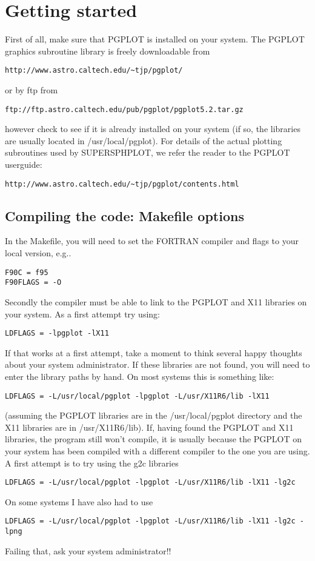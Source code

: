 \documentclass[a4paper,12pt]{article}
\begin{document}
\section{Getting started}
 First of all, make sure that PGPLOT is installed on your system. The PGPLOT
graphics subroutine library is freely downloadable from
\begin{verbatim}
http://www.astro.caltech.edu/~tjp/pgplot/
\end{verbatim}
or by ftp from 
\begin{verbatim} 
ftp://ftp.astro.caltech.edu/pub/pgplot/pgplot5.2.tar.gz
\end{verbatim}
however check to see if it is already installed on your system (if so, the libraries are
usually located in /usr/local/pgplot). For details of the actual plotting subroutines
used by SUPERSPHPLOT, we refer the reader to the PGPLOT userguide:
\begin{verbatim}
http://www.astro.caltech.edu/~tjp/pgplot/contents.html
\end{verbatim}

\subsection{Compiling the code: Makefile options} 
 In the Makefile, you will need to set the FORTRAN compiler and flags to your local version, e.g..
\begin{verbatim}
F90C = f95
F90FLAGS = -O
\end{verbatim}
 Secondly the compiler must be able to link to the PGPLOT and X11 libraries on
your system. As a first attempt try using:
\begin{verbatim}
LDFLAGS = -lpgplot -lX11
\end{verbatim}
If that works at a first attempt, take a moment to think several happy thoughts about your system
administrator. If these libraries are not found, you will need to enter the
library paths by hand. On most systems this is something like:
\begin{verbatim}
LDFLAGS = -L/usr/local/pgplot -lpgplot -L/usr/X11R6/lib -lX11
\end{verbatim}
(assuming the PGPLOT libraries are in the /usr/local/pgplot directory and the
X11 libraries are in /usr/X11R6/lib). If, having found the PGPLOT and X11
libraries, the program still won't compile, it is usually
because the PGPLOT on your system has been compiled with a different compiler to
the one you are using. A first attempt is to try using the g2c libraries
\begin{verbatim}
LDFLAGS = -L/usr/local/pgplot -lpgplot -L/usr/X11R6/lib -lX11 -lg2c
\end{verbatim}
On some systems I have also had to use
\begin{verbatim}
LDFLAGS = -L/usr/local/pgplot -lpgplot -L/usr/X11R6/lib -lX11 -lg2c -lpng
\end{verbatim}
Failing that, ask your system administrator!!
\end{document}
